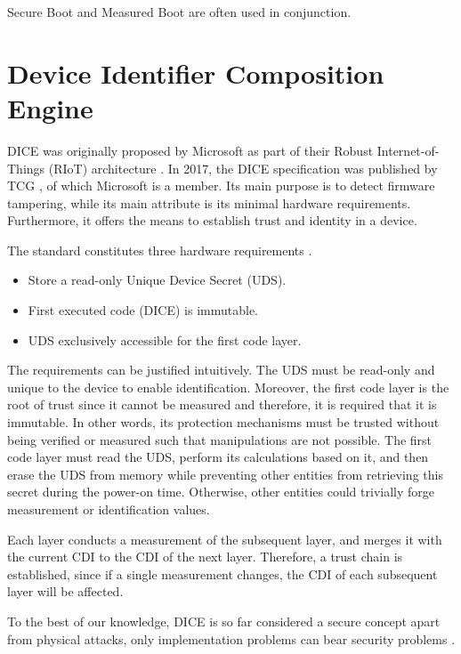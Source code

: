 Secure Boot and Measured Boot are often used in conjunction.

\section{Device Identifier Composition Engine}

\ac{DICE} was originally proposed by Microsoft as part of their Robust Internet-of-Things (RIoT) architecture \cite{England2016}. In 2017, the DICE specification was published by \ac{TCG} \cite{tcg-microsoft-tpm}, of which Microsoft is a member.
Its main purpose is to detect firmware tampering, while its main attribute is its minimal hardware requirements.
Furthermore, it offers the means to establish trust and identity in a device.

The standard constitutes three hardware requirements \cite{dice-hardware-reqs}.
\begin{itemize}
  \item Store a read-only Unique Device Secret (UDS).
  \item First executed code (DICE) is immutable.
  \item UDS exclusively accessible for the first code layer.
\end{itemize}
The requirements can be justified intuitively. The UDS must be read-only and unique to the device to enable identification. Moreover, the first code layer is the root of trust since it cannot be measured and therefore, it is required that it is immutable. In other words, its protection mechanisms must be trusted without being verified or measured such that manipulations are not possible. The first code layer must read the UDS, perform its calculations based on it, and then erase the UDS from memory while preventing other entities from retrieving this secret during the power-on time. Otherwise, other entities could trivially forge measurement or identification values.


Each layer conducts a measurement of the subsequent layer, and merges it with the current CDI to the CDI of the next layer. Therefore, a trust chain is established, since if a single measurement changes, the CDI of each subsequent layer will be affected.





To the best of our knowledge, \ac{DICE} is so far considered a secure concept apart from physical attacks, only implementation problems can bear security problems \cite{Jaeger2020}.
